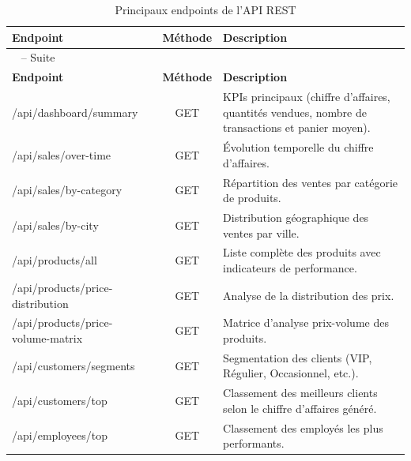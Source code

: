 \documentclass[12pt,a4paper,twoside]{report}
\begin{document}
\begin{longtable}{>{\ttfamily}p{5cm}cp{7cm}}
\caption{Principaux endpoints de l'API REST}
\label{tab:api-endpoints}\\

\toprule
\rowcolor{TableHeader}
\color{white}\textbf{Endpoint} &
\color{white}\textbf{Méthode} &
\color{white}\textbf{Description} \\
\midrule
\endfirsthead

\multicolumn{3}{c}%
{{\tablename\ \thetable{} -- Suite}}\\
\toprule
\rowcolor{TableHeader}
\color{white}\textbf{Endpoint} &
\color{white}\textbf{Méthode} &
\color{white}\textbf{Description} \\
\midrule
\endhead

\bottomrule
\endfoot

\bottomrule
\endlastfoot

/api/dashboard/summary & GET &
KPIs principaux (chiffre d'affaires, quantités vendues, nombre de transactions et panier moyen). \\

/api/sales/over-time & GET &
Évolution temporelle du chiffre d'affaires. \\

/api/sales/by-category & GET &
Répartition des ventes par catégorie de produits. \\

/api/sales/by-city & GET &
Distribution géographique des ventes par ville. \\

/api/products/all & GET &
Liste complète des produits avec indicateurs de performance. \\

/api/products/price-
distribution & GET &
Analyse de la distribution des prix. \\

/api/products/price-
volume-matrix & GET &
Matrice d'analyse prix-volume des produits. \\

/api/customers/segments & GET &
Segmentation des clients (VIP, Régulier, Occasionnel, etc.). \\

/api/customers/top & GET &
Classement des meilleurs clients selon le chiffre d'affaires généré. \\

/api/employees/top & GET &
Classement des employés les plus performants. \\


\end{longtable}
\end{document}
